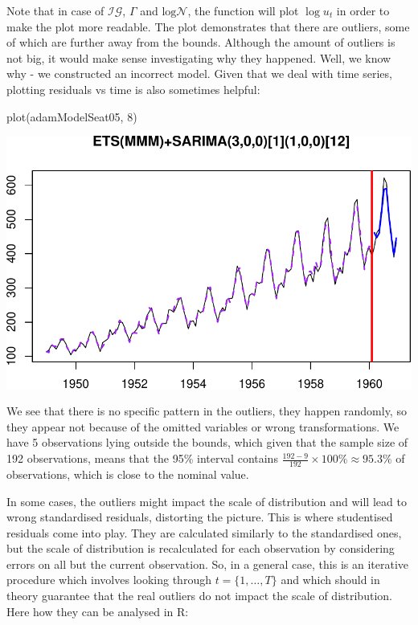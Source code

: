 \documentclass[
]{book}
\newenvironment{Shaded}{\begin{snugshade}}{\end{snugshade}}
\newcommand{\DecValTok}[1]{\textcolor[rgb]{0.00,0.00,0.81}{#1}}
\newcommand{\FunctionTok}[1]{\textcolor[rgb]{0.00,0.00,0.00}{#1}}
\newcommand{\NormalTok}[1]{#1}
\theoremstyle{definition}
\theoremstyle{definition}
\theoremstyle{definition}
\theoremstyle{definition}
\theoremstyle{remark}
\begin{document}
Note that in case of \(\mathcal{IG}\), \(\Gamma\) and \(\mathrm{log}\mathcal{N}\), the function will plot \(\log u_t\) in order to make the plot more readable. The plot demonstrates that there are outliers, some of which are further away from the bounds. Although the amount of outliers is not big, it would make sense investigating why they happened. Well, we know why - we constructed an incorrect model. Given that we deal with time series, plotting residuals vs time is also sometimes helpful:

\begin{Shaded}
\begin{Highlighting}[]
\FunctionTok{plot}\NormalTok{(adamModelSeat05, }\DecValTok{8}\NormalTok{)}
\end{Highlighting}
\end{Shaded}

\includegraphics{adam_files/figure-latex/unnamed-chunk-141-1.pdf}

We see that there is no specific pattern in the outliers, they happen randomly, so they appear not because of the omitted variables or wrong transformations. We have 5 observations lying outside the bounds, which given that the sample size of 192 observations, means that the 95\% interval contains \(\frac{192-9}{192} \times 100 \mathrm{\%} \approx 95.3\mathrm{\%}\) of observations, which is close to the nominal value.

In some cases, the outliers might impact the scale of distribution and will lead to wrong standardised residuals, distorting the picture. This is where studentised residuals come into play. They are calculated similarly to the standardised ones, but the scale of distribution is recalculated for each observation by considering errors on all but the current observation. So, in a general case, this is an iterative procedure which involves looking through \(t=\{1,\dots,T\}\) and which should in theory guarantee that the real outliers do not impact the scale of distribution. Here how they can be analysed in R:
\end{document}
